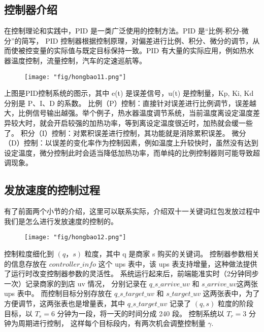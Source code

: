 \subsection{控制器介绍}
 在控制理论和实践中，PID 是一类广泛使用的控制方法。PID 是“比例-积分-微分”的简写， PID 控制器根据控制原理，对偏差进行比例、积分、微分的调节，从而使被控变量的实际值与既定目标保持一致。PID 有大量的实际应用，例如热水器温度控制，流量控制，汽车的定速巡航等。

\begin{figure}[!h]
	\centering
	\texttt{[image: "fig/hongbao11.png"]}
	\caption{}
	\label{fig:hongbao11}
\end{figure}

上图是PID控制系统的图示，其中 e(t) 是误差信号，u(t) 是控制量，Kp, Ki, Kd 分别是 P、I、D 的系数。
比例（P）控制：直接针对误差进行比例调节，误差越大，比例信号输出越强。举个例子，热水器温度调节系统，当前温度离设定温度差异较大时，就会开启较强的加热功率，等到离设定温度很近时，加热就会缓一些了。
积分（I）控制：对累积误差进行控制，其功能就是消除累积误差。
微分（D）控制：以误差的变化率作为控制因素，例如温度上升较快时，虽然没有达到设定温度，微分控制此时会适当降低加热功率，而单纯的比例控制器则可能导致超调现象。
\subsection{发放速度的控制过程}
有了前面两个小节的介绍，这里可以联系实际，介绍双十一关键词红包发放过程中我们是怎么进行发放速度的控制的。

\begin{figure}[!h]
	\centering
	\texttt{[image: "fig/hongbao12.png"]}
	\caption{}
	\label{fig:hongbao12}
\end{figure}

控制粒度细化到 $(q， s)$ 粒度，其中 q 是商家 s 购买的关键词。
控制器参数相关的信息存放在 $controller\_info$ 这个 ups 表中，该 ups 表支持增量，这种做法提供了运行时改变控制器参数的灵活性。
系统运行起来后，前端能准实时（2分钟同步一次）记录商家的到店 uv 情况， 分别记录在 $q\_s\_arrive\_uv$ 和 $s\_arrive\_uv $这两张 ups 表中。
而控制目标分别存放在 $q\_s\_target\_uv$ 和 $s\_target\_uv$ 这两张表中，为了方便调节，这两张表也是增量表，其中 $q\_s\_target\_uv$ 记录了 $(q, s)$ 粒度的阶段目标，以 $T_s = 6$ 分钟为一段，将一天的时间分成 240 段。 控制系统以 $T_r = 3$ 分钟为周期进行控制， 这样每个目标段内，有两次机会调整控制量 $ \gamma $.

